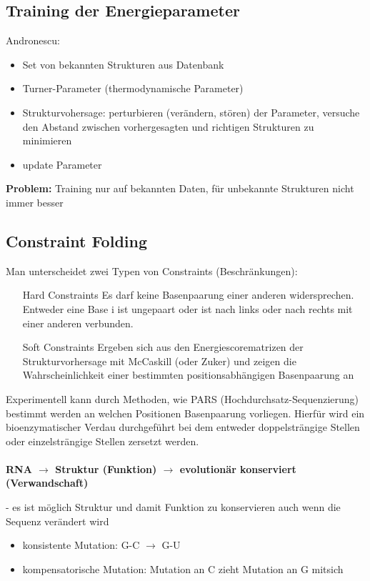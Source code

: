 \subsection{Training der Energieparameter}
Andronescu:
\begin{itemize}
	\item Set von bekannten Strukturen aus Datenbank
	\item Turner-Parameter (thermodynamische Parameter)
	\item Strukturvohersage: perturbieren (verändern, stören) der Parameter, versuche den Abstand zwischen vorhergesagten und richtigen Strukturen zu minimieren
	\item update Parameter
\end{itemize}

\textbf{Problem:} Training nur auf bekannten Daten, für unbekannte Strukturen nicht immer besser

\subsection{Constraint Folding}
Man unterscheidet zwei Typen von Constraints (Beschränkungen):
\begin{itemize}
\item[Hard Constraints] Es darf keine Basenpaarung einer anderen widersprechen. Entweder eine Base i ist ungepaart oder ist nach links oder nach rechts mit einer anderen verbunden. 
\item[Soft Constraints] Ergeben sich aus den Energiescorematrizen der Strukturvorhersage mit McCaskill (oder Zuker) und zeigen die Wahrscheinlichkeit einer bestimmten positionsabhängigen Basenpaarung an
\end{itemize}

Experimentell kann durch Methoden, wie PARS (Hochdurchsatz-Sequenzierung) bestimmt werden an welchen Positionen Basenpaarung vorliegen. Hierfür wird ein bioenzymatischer Verdau durchgeführt bei dem entweder doppelsträngige Stellen oder einzelsträngige Stellen zersetzt werden.
\\\\
\textbf{RNA $\rightarrow$ Struktur (Funktion) $\rightarrow$ evolutionär konserviert (Verwandschaft)}

- es ist möglich Struktur und damit Funktion zu konservieren auch wenn die Sequenz verändert wird

\begin{itemize}
	\item konsistente Mutation: G-C $\rightarrow$ G-U
	\item kompensatorische Mutation: Mutation an C zieht Mutation an G mitsich
\end{itemize}

